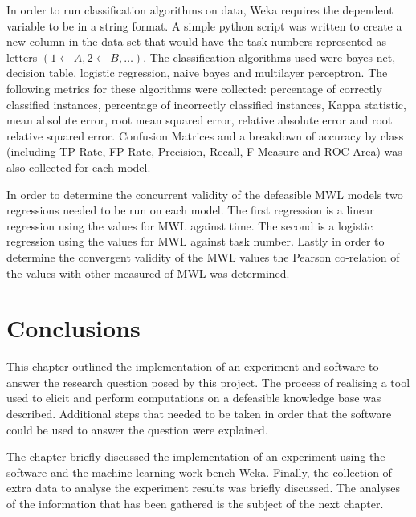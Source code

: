 In order to run classification algorithms on data, Weka requires the dependent variable to be in a string format. A simple python script was written to create a new column in the data set that would have the task numbers represented as letters $(1 \leftarrow A, 2 \leftarrow B, \ldots)$.
The classification algorithms used were bayes net, decision table, logistic regression, naive bayes and multilayer perceptron. The following metrics for these algorithms were collected: percentage of correctly classified instances, percentage of incorrectly classified instances, Kappa statistic, mean absolute error, root mean squared error, relative absolute error and root relative squared error. Confusion Matrices and a breakdown of accuracy by class (including TP Rate, FP Rate, Precision, Recall, F-Measure and ROC Area) was also collected for each model.

In order to determine the concurrent validity of the defeasible MWL models two regressions needed to be run on each model. The first regression is a linear regression using the values for MWL against time. The second is a logistic regression using the values for MWL against task number. Lastly in order to determine the convergent validity of the MWL values the Pearson co-relation of the values with other measured of MWL was determined.

\section{Conclusions}

This chapter outlined the implementation of an experiment and software to answer the research question posed by this project. The process of realising a tool used to elicit and perform computations on a defeasible knowledge base was described. Additional steps that needed to be taken in order that the software could be used to answer the question were explained.

The chapter briefly discussed the implementation of an experiment using the software and the machine learning work-bench Weka. Finally, the collection of extra data to analyse the experiment results was briefly discussed. The analyses of the information that has been gathered is the subject of the next chapter.